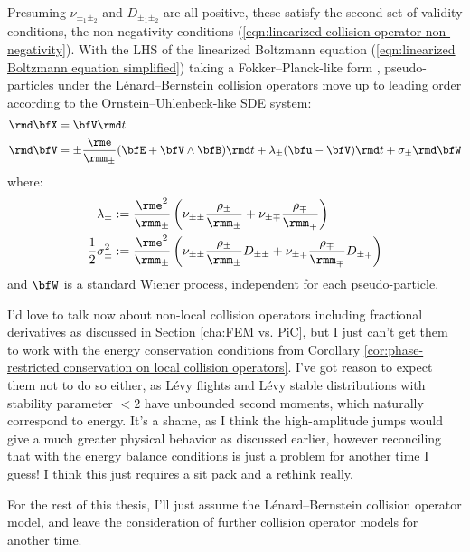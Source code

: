     Presuming $\nu_{\pm_{1}\pm_{2}}$ and $D_{\pm_{1}\pm_{2}}$ are all positive, these satisfy the second set of validity conditions, the non-negativity conditions (\ref{eqn:linearized collision operator non-negativity}). With the LHS of the linearized Boltzmann equation (\ref{eqn:linearized Boltzmann equation simplified}) taking a Fokker--Planck-like form \cite{Fokker_1914, Planck_1917}, pseudo-particles under the Lénard--Bernstein collision operators move up to leading order according to the Ornstein--Uhlenbeck-like \cite{Gardiner_1985, Karatzas_Shreve_1991, Gard_1998} SDE system:
    \begin{align}
        \rmd\bfX  &=  \bfV\rmd t  \label{eqn:particle motion SDE}  \\
        \rmd\bfV  &=  \pm\frac{\rme}{\rmm_{\pm}}(\bfE + \bfV\wedge\bfB)\rmd t + \lambda_{\pm}(\bfu - \bfV)\rmd t + \sigma_{\pm}\rmd\bfW  \label{eqn:particle forcing SDE}
    \end{align}
    where:
    \begin{align}
        \lambda_{\pm}                &:=  \frac{\rme^{2}}{\rmm_{\pm}}\left(\nu_{\pm\pm}\frac{\rho_{\pm}}{\rmm_{\pm}} + \nu_{\pm\mp}\frac{\rho_{\mp}}{\rmm_{\mp}}\right)  \\
        \frac{1}{2}\sigma_{\pm}^{2}  &:=  \frac{\rme^{2}}{\rmm_{\pm}}\left(\nu_{\pm\pm}\frac{\rho_{\pm}}{\rmm_{\pm}}D_{\pm\pm} + \nu_{\pm\mp}\frac{\rho_{\mp}}{\rmm_{\mp}}D_{\pm\mp}\right)
    \end{align}
    and $\bfW$ is a standard Wiener process, independent for each pseudo-particle.

    \begin{remark}
        I'd love to talk now about non-local collision operators including fractional derivatives as discussed in Section \ref{cha:FEM vs. PiC}, but I just can't get them to work with the energy conservation conditions from Corollary \ref{cor:phase-restricted conservation on local collision operators}. I've got reason to expect them not to do so either, as Lévy flights and Lévy stable distributions with stability parameter $< 2$ have unbounded second moments, which naturally correspond to energy. It's a shame, as I think the high-amplitude jumps would give a much greater physical behavior as discussed earlier, however reconciling that with the energy balance conditions is just a problem for another time I guess! I think this just requires a sit pack and a rethink really.

        For the rest of this thesis, I'll just assume the Lénard--Bernstein collision operator model, and leave the consideration of further collision operator models for another time.
    \end{remark}
    